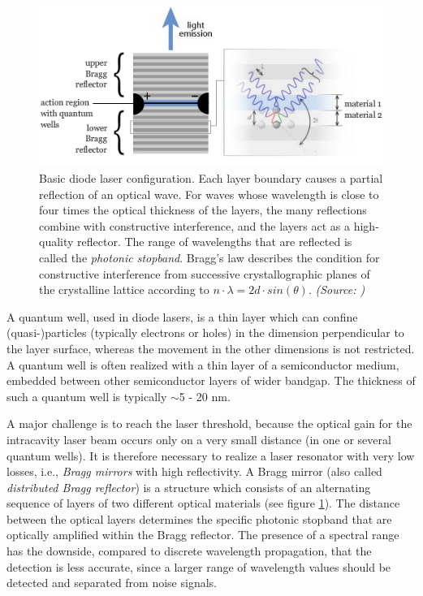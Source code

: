 \begin{figure} [ht]
\centering
\includegraphics[scale=0.6]{chapters/img/diodelaser.png}	
\caption[Basic diode laser configuration]{Basic diode laser configuration. Each layer boundary causes a partial reflection of an optical wave. For waves whose wavelength is close to four times the optical thickness of the layers, the many reflections combine with constructive interference, and the layers act as a high-quality reflector. The range of wavelengths that are reflected is called the \textit{photonic stopband}. Bragg's law describes the condition for constructive interference from successive crystallographic planes of the crystalline lattice according to $n\cdot\lambda  =2d\cdot sin(\theta)$. \emph{(Source: \cite{laser_power})}} 
\label{diode_laser_configuration}
\end{figure}

A quantum well, used in diode lasers, is a thin layer which can confine (quasi-)particles (typically electrons or holes) in the dimension perpendicular to the layer surface, whereas the movement in the other dimensions is not restricted. A quantum well is often realized with a thin layer of a semiconductor medium, embedded between other semiconductor layers of wider bandgap. The thickness of such a quantum well is typically $\sim$5 - 20 nm. 

A major challenge is to reach the laser threshold, because the optical gain for the intracavity laser beam occurs only on a very small distance (in one or several quantum wells). It is therefore necessary to realize a laser resonator with very low losses, i.e., \textit{Bragg mirrors} with high reflectivity. A Bragg mirror (also called \textit{distributed Bragg reflector}) is a structure which consists of an alternating sequence of layers of two different optical materials (see figure \ref{diode_laser_configuration}). The distance between the optical layers determines the specific photonic stopband that are optically amplified within the Bragg reflector. The presence of a spectral range has the downside, compared to discrete wavelength propagation, that the detection is less accurate, since a larger range of wavelength values should be detected and separated from noise signals. 

